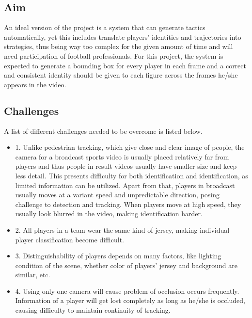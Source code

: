 \documentclass{article}
\begin{document}
\subsection{Aim}
An ideal version of the project is a system that can generate tactics automatically, yet this includes translate players’ identities and trajectories into strategies, thus being way too complex for the given amount of time and will need participation of football professionals. For this project, the system is expected to generate a bounding box for every player in each frame and a correct and consistent identity should be given to each figure across the frames he/she appears in the video.
\subsection{Challenges}
A list of different challenges needed to be overcome is listed below.
\begin{itemize}
\item 1. Unlike pedestrian tracking, which give close and clear image of people, the camera for a broadcast sports video is usually placed relatively far from players and thus people in result videos usually have smaller size and keep less detail. This presents difficulty for both identification and identification, as limited information can be utilized. Apart from that, players in broadcast usually moves at a variant speed and unpredictable direction, posing challenge to detection and tracking. When players move at high speed, they usually look blurred in the video, making identification harder.
\item 2. All players in a team wear the same kind of jersey, making individual player classification become difficult. 
\item 3. Distinguishability of players depends on many factors, like lighting condition of the scene, whether color of players’ jersey and background are similar, etc.
\item 4. Using only one camera will cause problem of occlusion occurs frequently. Information of a player will get lost completely as long as he/she is occluded, causing difficulty to maintain continuity of tracking.
\end{itemize}
\end{document}
